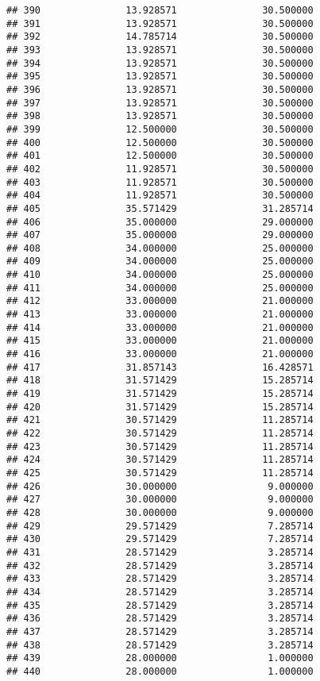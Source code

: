 \documentclass[]{article}
\begin{document}
\begin{verbatim}
## 390               13.928571               30.500000
## 391               13.928571               30.500000
## 392               14.785714               30.500000
## 393               13.928571               30.500000
## 394               13.928571               30.500000
## 395               13.928571               30.500000
## 396               13.928571               30.500000
## 397               13.928571               30.500000
## 398               13.928571               30.500000
## 399               12.500000               30.500000
## 400               12.500000               30.500000
## 401               12.500000               30.500000
## 402               11.928571               30.500000
## 403               11.928571               30.500000
## 404               11.928571               30.500000
## 405               35.571429               31.285714
## 406               35.000000               29.000000
## 407               35.000000               29.000000
## 408               34.000000               25.000000
## 409               34.000000               25.000000
## 410               34.000000               25.000000
## 411               34.000000               25.000000
## 412               33.000000               21.000000
## 413               33.000000               21.000000
## 414               33.000000               21.000000
## 415               33.000000               21.000000
## 416               33.000000               21.000000
## 417               31.857143               16.428571
## 418               31.571429               15.285714
## 419               31.571429               15.285714
## 420               31.571429               15.285714
## 421               30.571429               11.285714
## 422               30.571429               11.285714
## 423               30.571429               11.285714
## 424               30.571429               11.285714
## 425               30.571429               11.285714
## 426               30.000000                9.000000
## 427               30.000000                9.000000
## 428               30.000000                9.000000
## 429               29.571429                7.285714
## 430               29.571429                7.285714
## 431               28.571429                3.285714
## 432               28.571429                3.285714
## 433               28.571429                3.285714
## 434               28.571429                3.285714
## 435               28.571429                3.285714
## 436               28.571429                3.285714
## 437               28.571429                3.285714
## 438               28.571429                3.285714
## 439               28.000000                1.000000
## 440               28.000000                1.000000
\end{verbatim}
\end{document}
